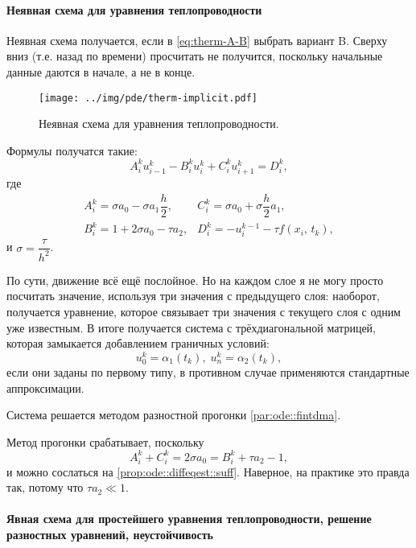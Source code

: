 \documentclass{trlnotes}
\begin{document}
\paragraph{Неявная схема для уравнения теплопроводности}

Неявная схема получается, если в \ref{eq:therm-A-B} выбрать вариант B. Сверху вниз (т.е. назад по времени) просчитать не получится, поскольку начальные данные даются в начале, а не в конце.

\begin{figure}[h] \label{fig:therm-implicit}
	\begin{center}
		\texttt{[image: ../img/pde/therm-implicit.pdf]}
	\end{center}
	\caption{Неявная схема для уравнения теплопроводности.}
\end{figure}

Формулы получатся такие:
\[
	A_i^k u_{i-1}^k - B_i^k u_i^k + C_i^k u_{i+1}^k = D_i^k,
\]
где
\[
	\begin{array}{ll}
		A_i^k = \sigma a_0 - \sigma a_1 \dfrac{h}{2}, & C_i^k = \sigma a_0 + \sigma \dfrac{h}{2} a_1, \\
		B_i^k = 1 + 2 \sigma a_0 - \tau a_2,  &D_i^k = -u_i^{k-1} - \tau f(x_i, \, t_k),
	\end{array}
\]
и $\sigma = \dfrac{\tau}{h^2}$.

По сути, движение всё ещё послойное. Но на каждом слое я не могу просто посчитать значение, используя три значения с предыдущего слоя: наоборот, получается уравнение, которое связывает три значения с текущего слоя с одним уже известным. В итоге получается система с трёхдиагональной матрицей, которая замыкается добавлением граничных условий:
\[
	u_0^k = \alpha_1(t_k), \; u_n^k = \alpha_2(t_k),
\]
если они заданы по первому типу, в противном случае применяются стандартные аппроксимации. 

Система решается методом разностной прогонки \ref{par:ode::fintdma}.

Метод прогонки срабатывает, поскольку
\[
	A_i^k + C_i^k = 2\sigma a_0 = B_i^k + \tau a_2 - 1,
\]
и можно сослаться на \ref{prop:ode::diffeqest::suff}. Наверное, на практике это правда так, потому что $\tau a_2 \ll 1$.



\paragraph{Явная схема для простейшего уравнения теплопроводности, решение разностных уравнений, неустойчивость}
\end{document}
